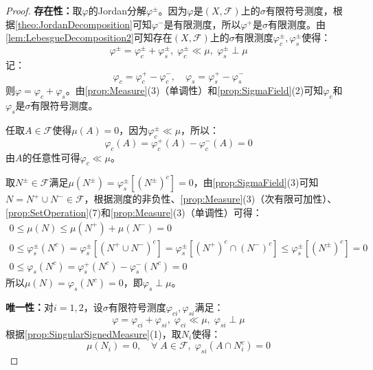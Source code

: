 \begin{proof}
	\textbf{存在性：}取$\varphi$的Jordan分解$\varphi^{\pm}$。因为$\varphi$是$(X,\mathscr{F})$上的$\sigma$有限符号测度，根据\cref{theo:JordanDecomposition}可知$\varphi^-$是有限测度，所以$\varphi^+$是$\sigma$有限测度。由\cref{lem:LebesgueDecomposition2}可知存在$(X,\mathscr{F})$上的$\sigma$有限测度$\varphi_c^{\pm},\varphi_s^{\pm}$使得：
	\begin{equation*}
		\varphi^{\pm}=\varphi_c^{\pm}+\varphi_s^{\pm},\;\varphi_c^{\pm}\ll\mu,\;\varphi_s^{\pm}\perp\mu
	\end{equation*}
	记：
	\begin{equation*}
		\varphi_c=\varphi_c^+-\varphi_c^-,\quad\varphi_s=\varphi_s^+-\varphi_s^-
	\end{equation*}
	则$\varphi=\varphi_c+\varphi_s$。由\cref{prop:Measure}(3)（单调性）和\cref{prop:SigmaField}(2)可知$\varphi_c$和$\varphi_s$是$\sigma$有限符号测度。\par
	任取$A\in\mathscr{F}$使得$\mu(A)=0$，因为$\varphi_c^{\pm}\ll\mu$，所以：
	\begin{equation*}
		\varphi_c(A)=\varphi_c^+(A)-\varphi_c^-(A)=0
	\end{equation*}
	由$A$的任意性可得$\varphi_c\ll\mu$。\par
	取$N^{\pm}\in\mathscr{F}$满足$\mu(N^{\pm})=\varphi_s^{\pm}[(N^{\pm})^c]=0$，由\cref{prop:SigmaField}(3)可知$N=N^+\cup N^-\in\mathscr{F}$，根据测度的非负性、\cref{prop:Measure}(3)（次有限可加性）、\cref{prop:SetOperation}(7)和\cref{prop:Measure}(3)（单调性）可得：
	\begin{gather*}
		0\leqslant\mu(N)\leqslant\mu(N^+)+\mu(N^-)=0 \\
		0\leqslant\varphi_s^{\pm}(N^c)=\varphi_s^{\pm}[(N^+\cup N^-)^c]=\varphi_s^{\pm}[(N^+)^c\cap (N^-)^c]\leqslant\varphi_s^{\pm}[(N^{\pm})^c]=0 \\
		0\leqslant\varphi_s(N^c)=\varphi_s^+(N^c)-\varphi_s^-(N^c)=0
	\end{gather*}
	所以$\mu(N)=\varphi_s(N^c)=0$，即$\varphi_s\perp\mu$。\par
	\textbf{唯一性：}对$i=1,2$，设$\sigma$有限符号测度$\varphi_{ci},\varphi_{si}$满足：
	\begin{equation*}
		\varphi=\varphi_{ci}+\varphi_{si},\;\varphi_{ci}\ll\mu,\;\varphi_{si}\perp\mu
	\end{equation*}
	根据\cref{prop:SingularSignedMeasure}(1)，取$N_i$使得：
	\begin{equation*}
		\mu(N_i)=0,\quad\forall\;A\in\mathscr{F},\;\varphi_{si}(A\cap N_i^c)=0
	\end{equation*}

\end{proof}
